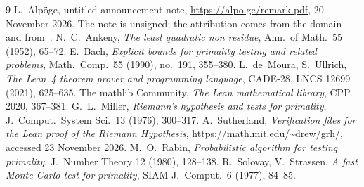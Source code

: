 \documentclass[11pt,a4paper]{amsart}
\theoremstyle{remark}
\begin{document}
\begin{thebibliography}{9}
 L.~Alp\"oge, untitled announcement note, \url{https://alpo.ge/remark.pdf}, 20 November 2026. The note is unsigned; the attribution comes from the domain and from~\cite{MIT}.
 N.~C.~Ankeny, \emph{The least quadratic non residue}, Ann.\ of Math.\ 55 (1952), 65--72.
 E.~Bach, \emph{Explicit bounds for primality testing and related problems}, Math.\ Comp.\ 55 (1990), no.~191, 355--380.
 L.~de~Moura, S.~Ullrich, \emph{The Lean~4 theorem prover and programming language}, CADE-28, LNCS 12699 (2021), 625--635.
 The mathlib Community, \emph{The Lean mathematical library}, CPP 2020, 367--381.
 G.~L.~Miller, \emph{Riemann's hypothesis and tests for primality}, J.\ Comput.\ System Sci.\ 13 (1976), 300--317.
 A.~Sutherland, \emph{Verification files for the Lean proof of the Riemann Hypothesis}, \url{https://math.mit.edu/~drew/grh/}, accessed 23 November 2026.
 M.~O.~Rabin, \emph{Probabilistic algorithm for testing primality}, J.\ Number Theory 12 (1980), 128--138.
 R.~Solovay, V.~Strassen, \emph{A fast Monte-Carlo test for primality}, SIAM J.\ Comput.\ 6 (1977), 84--85.
\end{thebibliography}
\end{document}
